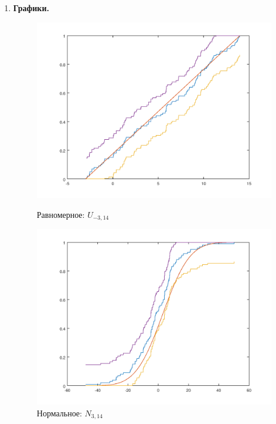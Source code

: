 \documentclass{article}
\begin{document}
	\begin{enumerate}
		\item {\bf Графики.}\\
		
		\begin{figure}[h]
			\centering
			\begin{minipage}{0.45\textwidth}
				\centering
				\includegraphics[width=\textwidth]{unif.png}
				\caption{Равномерное: $U_{-3,14}$}
			\end{minipage}\hfill
			\begin{minipage}{0.45\textwidth}
				\centering
				\includegraphics[width=\textwidth]{norm_plt.png} %
				\caption{Нормальное: $N_{3,14}$}
			\end{minipage}
		\end{figure}
		

\end{enumerate}
\end{document}
